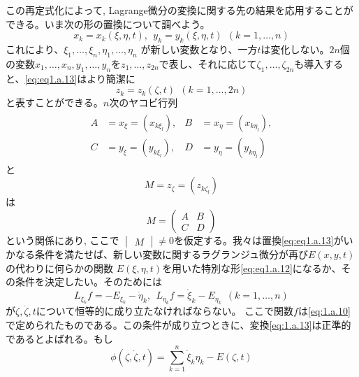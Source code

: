 \documentclass[dvipdfmx, leqno]{jsbook}
\begin{document}
    この再定式化によって, Lagrange微分の変換に関する先の結果を応用することができる。いま次の形の置換について調べよう。
\begin{equation} \label{eq:eq1.a.13}
    x_k= x_k(\xi, \eta, t), \ \ y_k= y_k(\xi, \eta, t) \ \ (k= 1, \dots, n)
\end{equation}
    これにより、$\xi_1, \dots, \xi_n, \eta_1, \dots, \eta_n$ が新しい変数となり、一方$t$は変化しない。$2n$個の変数$x_1, \dots, x_n, y_1, \dots, y_n$を$z_1, \dots, z_{2n}$で表し、それに応じて$\zeta_1, \dots, \zeta_{2n}$も導入すると、\eqref{eq:eq1.a.13}はより簡潔に
\begin{equation}
    z_k= z_k(\zeta, t) \ \ (k= 1, \dots, 2n)
\end{equation}
    と表すことができる。$n$次のヤコビ行列
\begin{align}
\begin{aligned}
    A&= x_\xi= (x_{k\xi_l}), &
    B&= x_\eta= (x_{k\eta_l}), \\
    C&= y_\xi= (y_{k\xi_l}), &
    D&= y_\eta= (y_{k\eta_l})
\end{aligned}
\end{align}
    と
\begin{equation}
    M= z_\zeta= (z_{k\zeta_l})
\end{equation}
    は
\begin{equation}
    M= \begin{pmatrix}A& B\\ C& D\end{pmatrix}
\end{equation}
    という関係にあり, ここで $\begin{vmatrix}M\end{vmatrix}\neq 0$を仮定する。我々は置換\eqref{eq:eq1.a.13}がいかなる条件を満たせば、新しい変数に関するラグランジュ微分が再び$E(x, y, t)$の代わりに何らかの関数 $E(\xi, \eta, t)$を用いた特別な形\eqref{eq:eq1.a.12}になるか、その条件を決定したい。そのためには
\begin{equation} \label{eq:eq1.a.16}
    L_{\xi_k}f= -E_{\xi_k}- \dot{\eta}_k, \ \ L_{\eta_k}f= \dot{\xi}_k- E_{\eta_k} \ \ (k= 1, \dots, n)
\end{equation}
    が$\zeta, \dot{\zeta}, t$について恒等的に成り立たなければならない。 ここで関数$f$は\eqref{eq:1.a.10}で定められたものである。この条件が成り立つときに、変換\eqref{eq:1.a.13}は正準的であるとよばれる。もし
\begin{equation}
    \phi(\zeta, \dot{\zeta}, t)= \sum_{k= 1}^{n} \dot{\xi}_k \eta_k - E(\zeta, t)
\end{equation}
\end{document}
